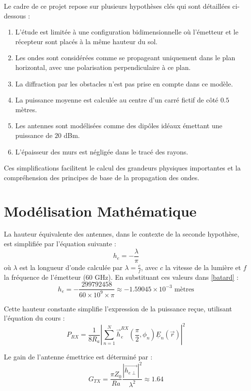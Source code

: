 Le cadre de ce projet repose sur plusieurs hypothèses clés qui sont détaillées ci-dessous :
\begin{enumerate}
    \item L'étude est limitée à une configuration bidimensionnelle où l'émetteur et le récepteur sont placés à la même hauteur du sol.
    \item Les ondes sont considérées comme se propageant uniquement dans le plan horizontal, avec une polarisation perpendiculaire à ce plan.
    \item La diffraction par les obstacles n'est pas prise en compte dans ce modèle.
    \item La puissance moyenne est calculée au centre d'un carré fictif de côté \(0.5\) mètres.
    \item Les antennes sont modélisées comme des dipôles idéaux émettant une puissance de \(20\) dBm.
    \item L'épaisseur des murs est négligée dans le tracé des rayons.
\end{enumerate}
Ces simplifications facilitent le calcul des grandeurs physiques importantes et la compréhension des principes de base de la propagation des ondes.

\section{Modélisation Mathématique}
La hauteur équivalente des antennes, dans le contexte de la seconde hypothèse, est simplifiée par l'équation suivante :
\begin{equation}
    h_e = -\frac{\lambda}{\pi}
    \label{batard}
\end{equation}
où \( \lambda \) est la longueur d'onde calculée par \( \lambda = \frac{c}{f} \), avec \( c \) la vitesse de la lumière et \( f \) la fréquence de l'émetteur (\(60\) GHz). En substituant ces valeurs dans \ref{batard} :
\[
    h_e = -\frac{299792458}{60 \times 10^9 \times \pi} \approx -1.59045 \times 10^{-3} \text{ mètres}
\]

Cette hauteur constante simplifie l'expression de la puissance reçue, utilisant l'équation du cours :
\begin{equation}
P_{RX} = \frac{1}{8 R_a} \left|\sum_{n=1}^{N} \vec{h}_e^{RX}\left(\frac{\pi}{2}, \phi_n\right) \underline{E}_n(\vec{r})\right|^2
\end{equation}

Le gain de l'antenne émettrice est déterminé par :
\begin{equation}
    G_{TX} = \frac{\pi Z_0}{Ra}\frac{|\vec{h_{e\perp}}|^2}{\lambda^2} \approx 1.64
\end{equation}



